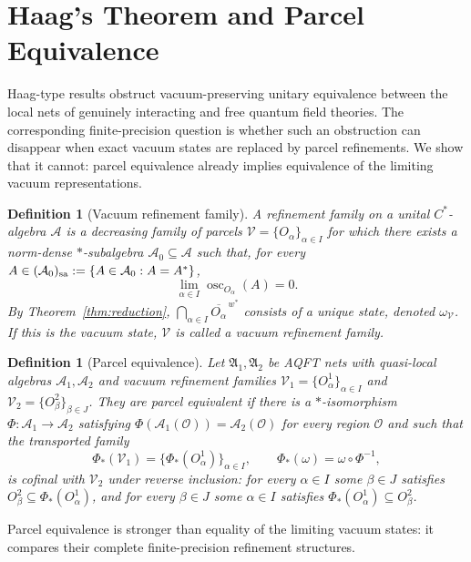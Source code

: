 \documentclass[11pt]{article}
\newtheorem{definition}[theorem]{Definition}
\newcommand{\A}{\mathcal{A}}
\begin{document}
\section{Haag's Theorem and Parcel Equivalence}
\label{sec:haag}

Haag-type results obstruct vacuum-preserving unitary equivalence between
the local nets of genuinely interacting and free quantum field theories.
The corresponding finite-precision question is whether such an
obstruction can disappear when exact vacuum states are replaced by parcel
refinements. We show that it cannot: parcel equivalence already implies
equivalence of the limiting vacuum representations.

\begin{definition}[Vacuum refinement family]
A \emph{refinement family} on a unital $C^*$-algebra $\A$ is a decreasing
family of parcels $\mathcal V=\{O_\alpha\}_{\alpha\in I}$ for which there
exists a norm-dense $*$-subalgebra $\A_0\subseteq\A$ such that, for every
$A\in(\A_0)_{\rm sa}:=\{A\in\A_0:A=A^*\}$,
\[
\lim_{\alpha\in I}
\operatorname{osc}_{O_\alpha}(A)
=
0.
\]
By Theorem~\ref{thm:reduction},
$\bigcap_{\alpha\in I}\overline{O_\alpha}^{\,w^*}$ consists of a unique
state, denoted $\omega_{\mathcal V}$. If this is the vacuum state,
$\mathcal V$ is called a \emph{vacuum refinement family}.
\end{definition}

\begin{definition}[Parcel equivalence]
\label{def:parceleq}
Let $\mathfrak A_1,\mathfrak A_2$ be AQFT nets with quasi-local algebras
$\A_1,\A_2$ and vacuum refinement families
$\mathcal V_1=\{O_\alpha^1\}_{\alpha\in I}$ and
$\mathcal V_2=\{O_\beta^2\}_{\beta\in J}$. They are
\emph{parcel equivalent} if there is a $*$-isomorphism
$\Phi:\A_1\to\A_2$ satisfying
$\Phi(\A_1(\mathcal O))=\A_2(\mathcal O)$ for every region $\mathcal O$
and such that the transported family
\[
\Phi_*(\mathcal V_1)
=
\{\Phi_*(O_\alpha^1)\}_{\alpha\in I},
\qquad
\Phi_*(\omega)=\omega\circ\Phi^{-1},
\]
is cofinal with $\mathcal V_2$ under reverse inclusion:
for every $\alpha\in I$ some $\beta\in J$ satisfies
$O_\beta^2\subseteq\Phi_*(O_\alpha^1)$, and for every $\beta\in J$ some
$\alpha\in I$ satisfies
$\Phi_*(O_\alpha^1)\subseteq O_\beta^2$.
\end{definition}

Parcel equivalence is stronger than equality of the limiting vacuum
states: it compares their complete finite-precision refinement structures.
\end{document}
